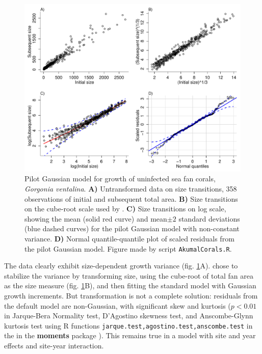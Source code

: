 \documentclass[11pt]{article}
\begin{document}
{\begin{figure}[tbp]
\centering
\includegraphics[width=\textwidth]{figures/AkumalPilot.pdf}
\caption{Pilot Gaussian model for growth of uninfected sea fan corals, \emph{Gorgonia ventalina}. \textbf{A)} Untransformed
data on size transitions, 358 observations of initial and subsequent total area. 
\textbf{B)} Size transitions on the cube-root scale used by \citet{bruno-etal-2011}. 
\textbf{C)} Size transitions on log scale, showing the mean (solid red curve) and mean$\pm 2$ standard deviations (blue dashed
curves) for the pilot Gaussian model with non-constant variance. \textbf{D)} Normal quantile-quantile plot of scaled residuals
from the pilot Gaussian model. Figure made by script \texttt{AkumalCorals.R}.}
\label{fig:AkumalPilot}
\end{figure} 

The data clearly exhibit size-dependent growth variance (fig. \ref{fig:AkumalPilot}A). 
\citet{bruno-etal-2011} chose to stabilize the variance by transforming size,
using the cube-root of total fan area as the size measure (fig. \ref{fig:AkumalPilot}B), and then fitting the standard 
model with Gaussian growth increments. But transformation is not a complete solution: residuals from 
the default model are non-Gaussian, with significant skew and kurtosis ($p<0.01$ in Jarque-Bera Normality test, D'Agostino skewness test, 
and Anscombe-Glynn kurtosis test using R functions \texttt{jarque.test,agostino.test,anscombe.test} in the 
in the \textbf{moments} package \citep{komsta-2015}). This remains true in a model with site and year effects and 
site-year interaction. 

}
\end{document}
